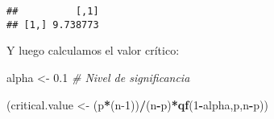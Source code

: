 \documentclass[
]{article}
\newenvironment{Shaded}{\begin{snugshade}}{\end{snugshade}}
\newcommand{\CommentTok}[1]{\textcolor[rgb]{0.56,0.35,0.01}{\textit{#1}}}
\newcommand{\DataTypeTok}[1]{\textcolor[rgb]{0.13,0.29,0.53}{#1}}
\newcommand{\DecValTok}[1]{\textcolor[rgb]{0.00,0.00,0.81}{#1}}
\newcommand{\FloatTok}[1]{\textcolor[rgb]{0.00,0.00,0.81}{#1}}
\newcommand{\KeywordTok}[1]{\textcolor[rgb]{0.13,0.29,0.53}{\textbf{#1}}}
\newcommand{\NormalTok}[1]{#1}
\newcommand{\OperatorTok}[1]{\textcolor[rgb]{0.81,0.36,0.00}{\textbf{#1}}}
\newcommand{\StringTok}[1]{\textcolor[rgb]{0.31,0.60,0.02}{#1}}
\begin{document}
\begin{Shaded}
\end{Shaded}

\begin{verbatim}
##          [,1]
## [1,] 9.738773
\end{verbatim}

Y luego calculamos el valor crítico:

\begin{Shaded}
\begin{Highlighting}[]
\NormalTok{alpha <-}\StringTok{ }\FloatTok{0.1} \CommentTok{# Nivel de significancia}

\NormalTok{(critical.value <-}\StringTok{ }\NormalTok{(p}\OperatorTok{*}\NormalTok{(n}\DecValTok{-1}\NormalTok{))}\OperatorTok{/}\NormalTok{(n}\OperatorTok{-}\NormalTok{p)}\OperatorTok{*}\KeywordTok{qf}\NormalTok{(}\DecValTok{1}\OperatorTok{-}\NormalTok{alpha,p,n}\OperatorTok{-}\NormalTok{p))}
\end{Highlighting}
\end{Shaded}
\end{document}
